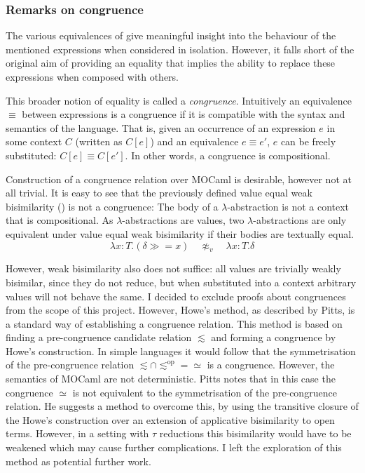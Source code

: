 \documentclass[12pt,twoside,notitlepage]{report}
\theoremstyle{plain}%
\theoremstyle{definition}
\theoremstyle{remark}
\begin{document}
\subsubsection{Remarks on congruence}

The various equivalences of  give meaningful insight into the behaviour of the mentioned expressions when considered in isolation. However, it falls short of the original aim of providing an equality that implies the ability to replace these expressions when composed with others. 

This broader notion of equality is called a \textit{congruence}. Intuitively an equivalence $ \equiv $ between expressions is a congruence if it is compatible with the syntax and semantics of the language. That is, given an occurrence of an expression $ e $ in some context $ C $ (written as $ C[e] $) and an equivalence $ e \equiv e' $, $ e $ can be freely substituted: $ C[e]\equiv C[e'] $. In other words, a congruence is compositional.

Construction of a congruence relation over MOCaml is desirable, however not at all trivial. It is easy to see that the previously defined value equal weak bisimilarity () is not a congruence: The body of a $ \lambda $-abstraction is not a context that is compositional. As $ \lambda $-abstractions are values, two $ \lambda $-abstractions are only equivalent under value equal weak bisimilarity if their bodies are textually equal.
\[ \lambda x : T.( \delta \gg= x)\quad \not\approx_v \quad \lambda x : T.\delta \]

However, weak bisimilarity also does not suffice: all values are trivially weakly bisimilar, since they do not reduce, but when substituted into a context arbitrary values will not behave the same. I decided to exclude proofs about congruences from the scope of this project. However, Howe's method\cite{howe1996proving}, as described by Pitts\cite{pitts2011howe}, is a standard way of establishing a congruence relation. This method is based on finding a pre-congruence candidate relation $ \lesssim $ and forming a congruence by Howe's construction. In simple languages it would follow that the symmetrisation of the pre-congruence relation  $ \lesssim \cap \lesssim^{\text{op}} = \simeq $ is a congruence. However, the semantics of MOCaml are not deterministic. Pitts notes that in this case the congruence $  \simeq$ is not equivalent to the symmetrisation of the pre-congruence relation. He suggests a method to overcome this, by using the transitive closure of the Howe's construction over an extension of applicative bisimilarity to open terms. However, in a setting with $ \tau $ reductions this bisimilarity would have to be weakened which may cause further complications. I left the exploration of this method as potential further work.
\end{document}
